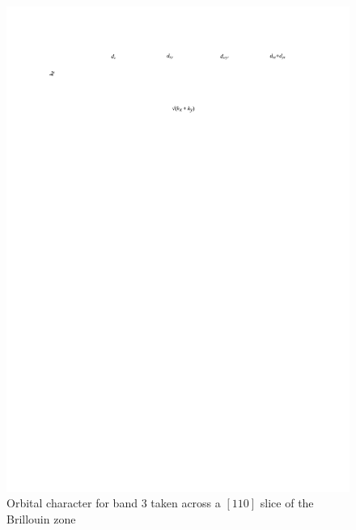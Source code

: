 \begin{figure}[h!]
    \begin{center}
        \includegraphics[scale=0.7]{Chapter-dHvABaFe2P2/Figures/AngleDepMeasurements/BandCharacterPlot/Band3_110Slice_BandCharacter}
        \caption{Orbital character for band 3 taken across a $[110]$ slice of the Brillouin zone}
        \label{Fig:Appendix:BandCharacter110Band3}
    \end{center}
\end{figure}

